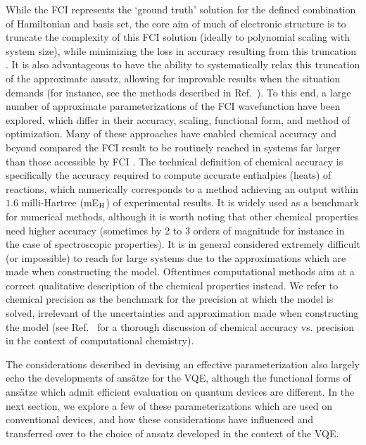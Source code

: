 While the FCI represents the `ground truth' solution for the defined combination of Hamiltonian and basis set, the core aim of much of electronic structure is to truncate the complexity of this FCI solution (ideally to polynomial scaling with system size), while minimizing the loss in accuracy resulting from this truncation \cite{Szabo1996}. It is also advantageous to have the ability to systematically relax this truncation of the approximate ansatz, allowing for improvable results when the situation demands (for instance, see the methods described in Ref.~\cite{Eriksen2020}). To this end, a large number of approximate parameterizations of the FCI wavefunction have been explored, which differ in their accuracy, scaling, functional form, and method of optimization. Many of these approaches have enabled chemical accuracy and beyond compared the FCI result to be routinely reached in systems far larger than those accessible by FCI \cite{White1992,Sharma2012,Tubman2016, Booth2010,Thomas2015,Li2018}. The technical definition of chemical accuracy is specifically the accuracy required to compute accurate enthalpies (heats) of reactions, which numerically corresponds to a method achieving an output within $1.6$ milli-Hartree (mE$_{\rm H}$) \cite{Peterson2012} of experimental results. It is widely used as a benchmark for numerical methods, although it is worth noting that other chemical properties need higher accuracy (sometimes by 2 to 3 orders of magnitude for instance in the case of spectroscopic properties). It is in general considered extremely difficult (or impossible) to reach for large systems due to the approximations which are made when constructing the model. Oftentimes computational methods aim at a correct qualitative description of the chemical properties instead. We refer to chemical precision as the benchmark for the precision at which the model is solved, irrelevant of the uncertainties and approximation made when constructing the model (see Ref.~\cite{Elfving2020} for a thorough discussion of chemical accuracy vs. precision in the context of computational chemistry). 

The considerations described in devising an effective parameterization also largely echo the developments of ans\"atze for the VQE, although the functional forms of ans\"atze which admit efficient evaluation on quantum devices are different. In the next section, we explore a few of these parameterizations which are used on conventional devices, and how these considerations have influenced and transferred over to the choice of ansatz developed in the context of the VQE.

